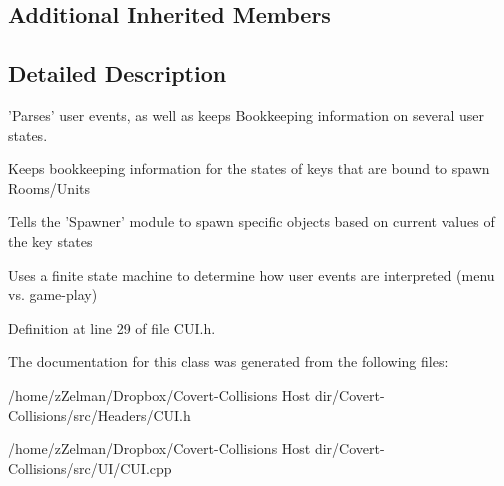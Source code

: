 \subsection*{Additional Inherited Members}


\subsection{Detailed Description}
'Parses' user events, as well as keeps Bookkeeping information on several user states. 

Keeps bookkeeping information for the states of keys that are bound to spawn Rooms/\-Units

Tells the 'Spawner' module to spawn specific objects based on current values of the key states

Uses a finite state machine to determine how user events are interpreted (menu vs. game-\/play) 

Definition at line 29 of file C\-U\-I.\-h.



The documentation for this class was generated from the following files\-:\begin{DoxyCompactItemize}
\item 
/home/z\-Zelman/\-Dropbox/\-Covert-\/\-Collisions Host dir/\-Covert-\/\-Collisions/src/\-Headers/C\-U\-I.\-h\item 
/home/z\-Zelman/\-Dropbox/\-Covert-\/\-Collisions Host dir/\-Covert-\/\-Collisions/src/\-U\-I/C\-U\-I.\-cpp\end{DoxyCompactItemize}
